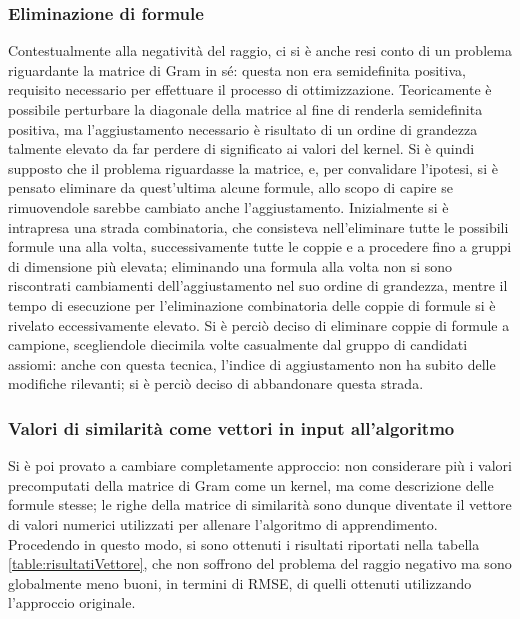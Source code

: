 \documentclass[12pt,a4paper]{report}
\begin{document}
\subsubsection{Eliminazione di formule}
Contestualmente alla negatività del raggio, ci si è anche resi conto di un problema riguardante la matrice di Gram in sé: questa non era semidefinita positiva, requisito necessario per effettuare il processo di ottimizzazione. Teoricamente è possibile perturbare la diagonale della matrice al fine di renderla semidefinita positiva, ma l'aggiustamento necessario è risultato di un ordine di grandezza talmente elevato da far perdere di significato ai valori del kernel. Si è quindi supposto che il problema riguardasse la matrice, e, per convalidare l'ipotesi, si è pensato eliminare da quest'ultima alcune formule, allo scopo di capire se rimuovendole sarebbe cambiato anche l'aggiustamento. Inizialmente si è intrapresa una strada combinatoria, che consisteva nell'eliminare tutte le possibili formule una alla volta, successivamente tutte le coppie e a procedere fino a gruppi di dimensione più elevata; eliminando una formula alla volta non si sono riscontrati cambiamenti dell'aggiustamento nel suo ordine di grandezza, mentre il tempo di esecuzione per l'eliminazione combinatoria delle coppie di formule si è rivelato eccessivamente elevato. Si è perciò deciso di eliminare coppie di formule a campione, scegliendole diecimila volte casualmente dal gruppo di candidati assiomi: anche con questa tecnica, l'indice di aggiustamento non ha subito delle modifiche rilevanti; si è perciò deciso di abbandonare questa strada. 

\subsubsection{Valori di similarità come vettori in input all'algoritmo}
\label{vettoriSection}
Si è poi provato a cambiare completamente approccio: non considerare più i valori precomputati della matrice di Gram come un kernel, ma come descrizione delle formule stesse; le righe della matrice di similarità sono dunque diventate il vettore di valori numerici utilizzati per allenare l'algoritmo di apprendimento.
Procedendo in questo modo, si sono ottenuti i risultati riportati nella tabella \ref{table:risultatiVettore}, che non soffrono del problema del raggio negativo ma sono globalmente meno buoni, in termini di RMSE, di quelli ottenuti utilizzando l'approccio originale.
\end{document}
